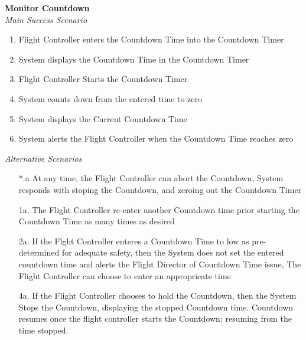\documentclass[letterpaper]{article}
\begin{document}
\noindent
\textbf{Monitor Countdown}\\
\textit{Main Success Scenario}
\begin{enumerate}
\item Flight Controller enters the Countdown Time into the Countdown
Timer
\item System displays the Countdown Time in the Countdown Timer
\item Flight Controller Starts the Countdown Timer
\item System counts down from the entered time to zero
\item System displays the Current Countdown Time
\item System alerts the Flight Controller when the Countdown Time
reaches zero
\end{enumerate}
\textit{Alternative Scenarios}
\begin{itemize}
\item[*.a]At any time, the Flight Controller can abort the Countdown,
System responds with stoping the Countdown, and zeroing out the
Countdown Timer
\item[1a.]The Flight Controller re-enter another Countdown time prior
starting the Countdown Time as many times as desired
\item[2a.]If the Flght Controller enteres a Countdown Time to low as
pre-determined for adequate safety, then the System does not set the
entered countdown time and alerts the Flight Director of Countdown Time
issue, The Flight Controller can choose to enter an approprieate time
\item[4a.]If the Flight Controller chooses to hold the Countdown, then
the System Stops the Countdown, displaying the stopped Countdown time.
Countdown resumes once the flight controller starts the Countdown:
resuming from the time stopped.
\end{itemize}
\end{document}
